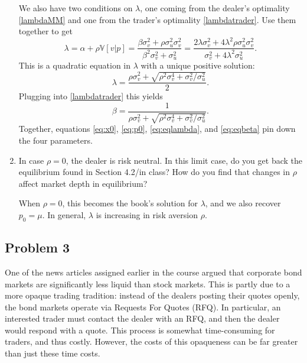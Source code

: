 \documentclass[11pt
]{exam}
\begin{document}
\begin{enumerate}[label=(\alph*). ]
\begin{solution}
We also have two conditions on $\lambda$, one coming from the dealer's optimality \eqref{lambdaMM} and one from the trader's optimality \eqref{lambdatrader}. Use them together to get
\[
\lambda =  \alpha + \rho \mathbb{V}[v|p] = \frac{\beta \sigma^{2}_{v} + \rho \sigma^{2}_{u} \sigma^{2}_{v}}{\beta^{2}\sigma^{2}_{v}+\sigma^{2}_{u}} = \frac{2\lambda \sigma^{2}_{v}+4\lambda^{2}\rho \sigma^{2}_{u}\sigma^{2}_{v}}{\sigma^{2}_{v}+4\lambda^{2} \sigma^{2}_{u}}.
\]
This is a quadratic equation in $\lambda$ with a unique positive solution:
\begin{equation} \label{eq:eqlambda}
\lambda = \frac{\rho \sigma^{2}_{v} + \sqrt{\rho^{2} \sigma^{4}_{v} + \sigma^{2}_{v}/ \sigma^{2}_{u}}}{2}.
\end{equation}
Plugging into \eqref{lambdatrader} this yields
\begin{equation} \label{eq:eqbeta}
\beta = \frac{1}{\rho \sigma^{2}_{v} + \sqrt{\rho^{2} \sigma^{4}_{v} + \sigma^{2}_{v}/ \sigma^{2}_{u}}}.
\end{equation}
Together, equations \eqref{eq:x0}, \eqref{eq:p0}, \eqref{eq:eqlambda}, and \eqref{eq:eqbeta} pin down the four parameters.

\end{solution}

\item In case $\rho= 0$, the dealer is risk neutral. In this limit case, do you get back the equilibrium found in Section 4.2/in class? How do you find that changes in $\rho$ affect market depth in equilibrium?

\begin{solution}
When $\rho=0$, this becomes the book's solution for $\lambda$, and we also recover $p_{0}=\mu$. In general, $\lambda$ is increasing in risk aversion $\rho$.
\end{solution}

\end{enumerate}



\qquad
\subsection*{Problem 3}

One of the news articles assigned earlier in the course argued that corporate bond markets are significantly less liquid than stock markets. This is partly due to a more opaque trading tradition: instead of the dealers posting their quotes openly, the bond markets operate via Requests For Quotes (RFQ). In particular, an interested trader must contact the dealer with an RFQ, and then the dealer would respond with a quote. This process is somewhat time-consuming for traders, and thus costly. However, the costs of this opaqueness can be far greater than just these time costs.
\end{document}
